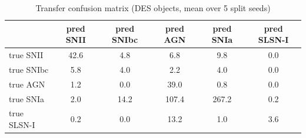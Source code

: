 \begin{table}
\centering
\caption{Transfer confusion matrix (DES objects, mean over 5 split seeds)}
\begin{tabular}{lccccc}
\hline
 & pred SNII & pred SNIbc & pred AGN & pred SNIa & pred SLSN-I \\
\hline
true SNII & 42.6 & 4.8 & 6.8 & 9.8 & 0.0 \\
true SNIbc & 5.8 & 4.0 & 2.2 & 4.0 & 0.0 \\
true AGN & 1.2 & 0.0 & 39.0 & 0.8 & 0.0 \\
true SNIa & 2.0 & 14.2 & 107.4 & 267.2 & 0.2 \\
true SLSN-I & 0.2 & 0.0 & 13.2 & 1.0 & 3.6 \\
\hline
\end{tabular}
\end{table}
